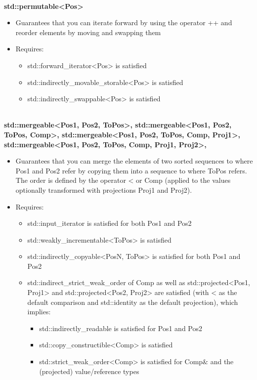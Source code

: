\noindent
\hspace*{\fill} \\ %
\textbf{std::permutable<Pos>}

\begin{itemize}
\item
Guarantees that you can iterate forward by using the operator ++ and reorder elements by moving and swapping them

\item
Requires:
\begin{itemize}
\item
std::forward\_iterator<Pos> is satisfied

\item
std::indirectly\_movable\_storable<Pos> is satisfied

\item
std::indirectly\_swappable<Pos> is satisfied
\end{itemize}
\end{itemize}

\noindent
\hspace*{\fill} \\ %
\textbf{std::mergeable<Pos1, Pos2, ToPos>,
std::mergeable<Pos1, Pos2, ToPos, Comp>,
std::mergeable<Pos1, Pos2, ToPos, Comp, Proj1>,
std::mergeable<Pos1, Pos2, ToPos, Comp, Proj1, Proj2>,}

\begin{itemize}
\item
Guarantees that you can merge the elements of two sorted sequences to where Pos1 and Pos2 refer by copying them into a sequence to where ToPos refers. The order is defined by the operator < or Comp (applied to the values optionally transformed with projections Proj1 and Proj2).

\item
Requires:
\begin{itemize}
\item
std::input\_iterator is satisfied for both Pos1 and Pos2

\item
std::weakly\_incrementable<ToPos> is satisfied

\item
std::indirectly\_copyable<PosN, ToPos> is satisfied for both Pos1 and Pos2

\item
std::indirect\_strict\_weak\_order of Comp as well as std::projected<Pos1, Proj1> and std::projected<Pos2, Proj2> are satisfied (with < as the default comparison and std::identity as the default projection), which implies:

\begin{itemize}
\item
std::indirectly\_readable is satisfied for Pos1 and Pos2

\item
std::copy\_constructible<Comp> is satisfied

\item
std::strict\_weak\_order<Comp> is satisfied for Comp\& and the (projected) value/reference types
\end{itemize}
\end{itemize}
\end{itemize}


